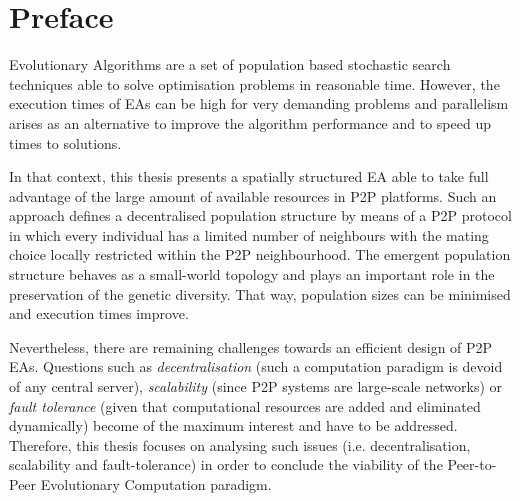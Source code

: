 

\chapter* {Preface}


Evolutionary Algorithms are a set of population based stochastic search techniques able to solve optimisation problems in reasonable time. However, the execution times of EAs can be high for very demanding problems and parallelism arises as an alternative to improve the algorithm performance and to speed up times to solutions. 

In that context, this thesis presents a spatially structured EA able to take full advantage of the large amount of available resources in P2P platforms. Such an approach defines a decentralised population structure by means of a P2P protocol in which every individual has a limited number of neighbours with the mating choice locally restricted within the P2P neighbourhood. The emergent population structure behaves as a small-world topology and plays an important role in the preservation of the genetic diversity. That way, population sizes can be minimised and  execution times improve.



Nevertheless, there are remaining challenges towards an efficient design of P2P EAs. Questions such as \emph{decentralisation} (such a computation paradigm is devoid of any central server), \emph{scalability} (since P2P systems  are large-scale networks) or \emph{fault tolerance} (given that computational resources are added and eliminated dynamically) become of the maximum interest and have to be addressed. Therefore, this thesis focuses on analysing such issues (i.e. decentralisation, scalability and fault-tolerance) in order to conclude the viability of the Peer-to-Peer Evolutionary Computation paradigm.








